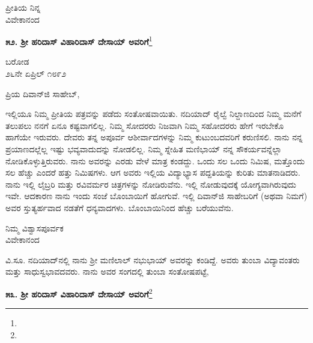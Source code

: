 \vspace{-0.62cm}

{\flushright
ಪ್ರೀತಿಯ ನಿನ್ನ\\ವಿವೇಕಾನಂದ\par}

\begin{center}
\textbf{೫೨. ಶ‍್ರೀ ಹರಿದಾಸ್ ವಿಹಾರಿದಾಸ್ ದೇಸಾಯ್ ಅವರಿಗೆ}\footnote{}
\end{center}

\vspace{-0.65cm}

\begin{flushright}
ಬರೋಡ\\೨೬ನೇ ಏಪ್ರಿಲ್ ೧೮೯೨
\end{flushright}

\noindent
ಪ್ರಿಯ ದಿವಾನ್‌ಜಿ ಸಾಹೇಬ್,

ಇಲ್ಲಿಯೂ ನಿಮ್ಮ ಪ್ರೀತಿಯ ಪತ್ರವನ್ನು ಪಡೆದು ಸಂತೋಷವಾಯಿತು. ನದಿಯಾದ್ ರೈಲ್ವೆ ನಿಲ್ದಾಣದಿಂದ ನಿಮ್ಮ ಮನೆಗೆ ತಲುಪಲು ನನಗೆ ಏನೂ ಕಷ್ಟವಾಗಲಿಲ್ಲ. ನಿಮ್ಮ ಸೋದರರು ನಿಜವಾಗಿ ನಿಮ್ಮ ಸಹೋದರರು ಹೇಗೆ ಇರಬೇಕೊ ಹಾಗೆಯೇ ಇರುವರು. ದೇವರು ತನ್ನ ಅಪೂರ್ವ ಆಶೀರ್ವಾದಗಳನ್ನು ನಿಮ್ಮ ಕುಟುಂಬದವರಿಗೆ ಕರುಣಿಸಲಿ. ನಾನು ನನ್ನ ಪ್ರಯಾಣದಲ್ಲೆಲ್ಲ ಇಷ್ಟು ಭವ್ಯವಾದುದನ್ನು ನೋಡಲಿಲ್ಲ. ನಿಮ್ಮ ಸ್ನೇಹಿತ ಮಣಿಭಾಯ್ ನನ್ನ ಸೌಕರ್ಯವನ್ನೆಲ್ಲಾ ನೋಡಿಕೊಳ್ಳುತ್ತಿರುವರು. ನಾನು ಅವರನ್ನು ಎರಡು ವೇಳೆ ಮಾತ್ರ ಕಂಡದ್ದು. ಒಂದು ಸಲ ಒಂದು ನಿಮಿಷ, ಮತ್ತೊಂದು ಸಲ ಹೆಚ್ಚು ಎಂದರೆ ಹತ್ತು ನಿಮಿಷಗಳು. ಆಗ ಅವರು ಇಲ್ಲಿಯ ವಿದ್ಯಾಭ್ಯಾಸ ಪದ್ದತಿಯನ್ನು ಕುರಿತು ಮಾತನಾಡಿದರು. ನಾನು ಇಲ್ಲಿ ಲೈಬ್ರರಿ ಮತ್ತು ರವಿವರ್ಮರ ಚಿತ್ರಗಳನ್ನು ನೋಡಿರುವೆನು. ಇಲ್ಲಿ ನೋಡುವುದಕ್ಕೆ ಯೋಗ್ಯವಾಗಿರುವುದು ಇವೇ. ಆದಕಾರಣ ನಾನು ಇಂದು ಸಂಜೆ ಬೊಂಬಾಯಿಗೆ ಹೋಗುವೆ. ಇಲ್ಲಿ ದಿವಾನ್‌ಜಿ ಸಾಹೇಬರಿಗೆ (ಅಥವಾ ನಿಮಗೆ) ಅವರ ಸ್ತುತ್ಯರ್ಹವಾದ ನಡತೆಗೆ ಧನ್ಯವಾದಗಳು. ಬೊಂಬಾಯಿನಿಂದ ಹೆಚ್ಚು ಬರೆಯುವೆನು.

\vspace{-0.55cm}

\begin{flushright}
ನಿಮ್ಮ ವಿಶ್ವಾಸಪೂರ್ವಕ\\ವಿವೇಕಾನಂದ
\end{flushright}

\vspace{-0.15cm}

ವಿ.ಸೂ. \enginline{-}ನದಿಯಾದ್‌ನಲ್ಲಿ ನಾನು ಶ‍್ರೀ ಮಣಿಲಾಲ್ ನಭುಭಾಯ್ ಅವರನ್ನು ಕಂಡಿದ್ದೆ. ಅವರು ತುಂಬಾ ವಿದ್ಯಾವಂತರು ಮತ್ತು ಸಾಧುಸ್ವಭಾವದವರು. ನಾನು ಅವರ ಸಂಗದಲ್ಲಿ ತುಂಬಾ ಸಂತೋಷಪಟ್ಟೆ,

\begin{center}
\textbf{೫೩. ಶ‍್ರೀ ಹರಿದಾಸ್ ವಿಹಾರಿದಾಸ್ ದೇಸಾಯ್ ಅವರಿಗೆ}\footnote{}
\end{center}

\vspace{-0.75cm}

